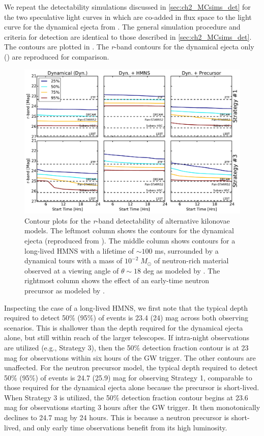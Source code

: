 We repeat the detectability simulations discussed in \cref{sec:ch2_MCsims_det} for the two speculative light curves in  which are co-added in flux space to the light curve for the dynamical ejecta from \citet{BarnesKasen13}. The general simulation procedure and criteria for detection are identical to those described in \cref{sec:ch2_MCsims_det}. The contours are plotted in . The {\em r}-band contours for the dynamical ejecta only () are reproduced for comparison. 

\begin{figure}[t!]
\centering
\includegraphics[width=\textwidth]{./figs/chapter2/f21.pdf}
\caption{\singlespace Contour plots for the {\em r}-band detectability of alternative kilonovae models. The leftmost column shows the contours for the dynamical ejecta (reproduced from ). The middle column shows contours for a long-lived HMNS with a lifetime of $\sim 100$ ms, surrounded by a dynamical tours with a mass of $10^{-2}\;M_{\odot}$  of neutron-rich material observed at a viewing angle of $\theta \sim 18$ deg as modeled by \citet{Kasen+15}. The rightmost column shows the effect of an early-time neutron precursor as modeled by \citet{Metzger+15}.}
\label{fig:ch2_altdet}
\end{figure}

Inspecting the case of a long-lived HMNS, we first note that the typical depth required to detect 50\% (95\%) of events is 23.4 (24) mag across both observing scenarios. This is shallower than the depth required for the dynamical ejecta alone, but still within reach of the larger telescopes. If intra-night observations are utilized (e.g., Strategy 3), then the 50\% detection fraction contour is at 23 mag for observations within six hours of the GW trigger. The other contours are unaffected. For the neutron precursor model, the typical depth required to detect 50\% (95\%) of events is 24.7 (25.9) mag for observing Strategy 1, comparable to those required for the dynamical ejecta alone because the precursor is short-lived. When Strategy 3 is utilized, the 50\% detection fraction contour begins at 23.6 mag for observations starting 3 hours after the GW trigger. It then monotonically declines to 24.7 mag by 24 hours. This is because a neutron precursor is short-lived, and only early time observations benefit from its high luminosity.

